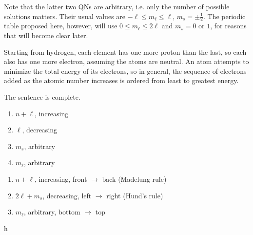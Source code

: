 \documentclass{article}
\begin{document}
Note that the latter two QNs are arbitrary,
i.e. only the number of possible solutions matters.
Their usual values are
$-\ell \leq m_\ell \leq \ell$,
$m_s = \pm \frac{1}{2}$.
The periodic table proposed here, however, will use
$0 \leq m_\ell \leq 2\ell$ and $m_s = 0$ or $1$,
for reasons that will become clear later.

Starting from hydrogen,
each element has one more proton than the last,
so each also has one more electron, assuming the atoms are neutral.
An atom attempts to minimize the total energy of its electrons,
so in general, the sequence of electrons added as the atomic number increases
is ordered from least to greatest energy.

The sentence is complete.

\begin{enumerate}
\item $n+\ell$, increasing
\item $\ell$, decreasing
\item $m_s$, arbitrary
\item $m_\ell$, arbitrary
\end{enumerate}

\begin{enumerate}
\item $n+\ell$, increasing, front $\rightarrow$ back (Madelung rule)
\item $2\ell+m_s$, decreasing, left $\rightarrow$ right (Hund's rule)
\item $m_\ell$, arbitrary, bottom $\rightarrow$ top
\end{enumerate}

\newpage

h
\end{document}
